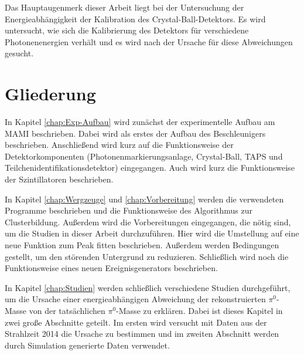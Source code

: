 \documentclass[a4paper,11pt,oneside,final,german,openbib,pdftex]{scrbook}
\begin{document}
{Das Hauptaugenmerk dieser Arbeit liegt bei der Untersuchung der Energieabh\"angigkeit der Kalibration des Crystal-Ball-Detektors. Es wird untersucht, wie sich die Kalibrierung des Detektors f\"ur verschiedene Photonenenergien verh\"alt und es wird nach der Ursache f\"ur diese Abweichungen gesucht. 
\newline	 
	
	
\section{Gliederung}

In Kapitel \ref{chap:Exp-Aufbau} wird zunächst der experimentelle Aufbau am MAMI beschrieben. Dabei wird als erstes der Aufbau des Beschleunigers beschrieben. Anschließend wird kurz auf die Funktionsweise der Detektorkomponenten (Photonenmarkierungsanlage, Crystal-Ball, TAPS und Teilchenidentifikationsdetektor) eingegangen. Auch wird kurz die Funktionsweise der Szintillatoren beschrieben.

In Kapitel \ref{chap:Wergzeuge} und \ref{chap:Vorbereitung} werden die verwendeten Programme beschrieben und die Funktionsweise des Algorithmus zur Clusterbildung. Außerdem wird die Vorbereitungen eingegangen, die nötig sind, um die Studien in dieser Arbeit durchzuführen. Hier wird die Umstellung auf eine neue Funktion zum Peak fitten beschrieben. Außerdem werden Bedingungen gestellt, um den störenden Untergrund zu reduzieren. Schließlich wird noch die Funktionsweise eines neuen Ereignisgenerators beschrieben.

In Kapitel \ref{chap:Studien} werden schließlich verschiedene Studien durchgeführt, um die Ursache einer energieabhängigen Abweichung der rekonstruierten $\pi^0$-Masse von der tatsächlichen $\pi^0$-Masse zu erklären. Dabei ist dieses Kapitel in zwei große Abschnitte geteilt. Im ersten wird versucht mit Daten aus der Strahlzeit 2014 die Ursache zu bestimmen und im zweiten Abschnitt werden durch Simulation generierte Daten verwendet.

}
\end{document}
